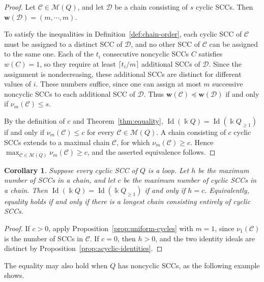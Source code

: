 \documentclass[11pt,reqno]{amsart}
\newcommand{\kk}{\Bbbk}
\newcommand{\Id}{\operatorname{Id}}
\newtheorem{corollary}[theorem]{Corollary}
\theoremstyle{definition}
\theoremstyle{remark}
\numberwithin{equation}{section}
\begin{document}
\begin{proof}
Let $\mathcal C\in\mathscr M(Q)$, and let $\mathcal D$
be a chain consisting of $s$ cyclic SCCs.
Then $\mathbf w(\mathcal D)=(m,\cdots,m)$.

To satisfy the inequalities in Definition~\ref{def:chain-order},
each cyclic SCC of $\mathcal C$ must be assigned to a distinct
SCC of $\mathcal D$, and no other SCC of $\mathcal C$ can be
assigned to the same one.
Each of the $t_i$ consecutive noncyclic SCCs $C$ satisfies
$w(C)=1$, so they require at least $\lceil t_i/m\rceil$
additional SCCs of $\mathcal D$.
Since the assignment is nondecreasing, these additional SCCs
are distinct for different values of $i$.
These numbers suffice, since one can assign at most $m$
successive noncyclic SCCs to each additional SCC of $\mathcal D$.
Thus
$
 \mathbf w(\mathcal C)\preceq\mathbf w(\mathcal D)
$ if and only if $
 \nu_m(\mathcal C)\le s$.

By the definition of $c$ and Theorem~\ref{thm:equality},
$\Id(\kk Q)=\Id(\kk Q_{\ge1})$ if and only if
$\nu_m(\mathcal C)\le c$ for every
$\mathcal C\in\mathscr M(Q)$.
A chain consisting of $c$ cyclic SCCs extends to a maximal
chain $\mathcal C$, for which $\nu_m(\mathcal C)\ge c$.
Hence
$\max_{\mathcal C\in\mathscr M(Q)}\nu_m(\mathcal C)\ge c$,
and the asserted equivalence follows.
\end{proof}


\begin{corollary}\label{cor:loops-height}
Suppose every cyclic SCC of $Q$ is a loop.
Let $h$ be the maximum number of SCCs in a chain, and let $c$ be
the maximum number of cyclic SCCs in a chain.
Then $\Id(\kk Q)=\Id(\kk Q_{\ge1})$ if and only if $h=c$.
Equivalently, equality holds if and only if there is a longest
chain consisting entirely of cyclic SCCs.
\end{corollary}

\begin{proof}
If $c>0$, apply Proposition~\ref{prop:uniform-cycles} with $m=1$,
since $\nu_1(\mathcal C)$ is the number of SCCs in $\mathcal C$.
If $c=0$, then $h>0$, and the two identity ideals are distinct
by Proposition~\ref{prop:acyclic-identities}.
\end{proof}

The equality may also hold when $Q$ has noncyclic SCCs,
as the following example shows.
\end{document}
